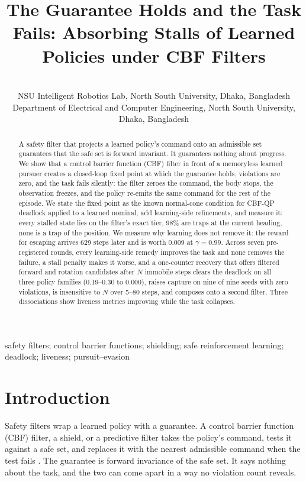 \documentclass{l4dc2027}
\title[Safe and Stuck]{The Guarantee Holds and the Task Fails: Absorbing Stalls of Learned Policies under CBF Filters}
\author{%
 \Name{Mohammad Shoaib} \Email{[to confirm]}\\
 \addr NSU Intelligent Robotics Lab, North South University, Dhaka, Bangladesh
 \AND
 \Name{Shahnewaz Siddique} \Email{shahnewaz.siddique@northsouth.edu}\\
 \addr Department of Electrical and Computer Engineering, North South University, Dhaka, Bangladesh%
}
\begin{document}
\maketitle

\begin{abstract}%
A safety filter that projects a learned policy's command onto an admissible set guarantees that the safe set is forward invariant. It guarantees nothing about progress. We show that a control barrier function (CBF) filter in front of a memoryless learned pursuer creates a closed-loop fixed point at which the guarantee holds, violations are zero, and the task fails silently: the filter zeroes the command, the body stops, the observation freezes, and the policy re-emits the same command for the rest of the episode. We state the fixed point as the known normal-cone condition for CBF-QP deadlock applied to a learned nominal, add learning-side refinements, and measure it: every stalled state lies on the filter's exact tier, 98\% are traps at the current heading, none is a trap of the position. We measure why learning does not remove it: the reward for escaping arrives 629 steps later and is worth 0.009 at $\gamma = 0.99$. Across seven pre-registered rounds, every learning-side remedy improves the task and none removes the failure, a stall penalty makes it worse, and a one-counter recovery that offers filtered forward and rotation candidates after $N$ immobile steps clears the deadlock on all three policy families (0.19--0.30 to 0.000), raises capture on nine of nine seeds with zero violations, is insensitive to $N$ over 5--80 steps, and composes onto a second filter. Three dissociations show liveness metrics improving while the task collapses.%
\end{abstract}

\begin{keywords}%
safety filters; control barrier functions; shielding; safe reinforcement learning; deadlock; liveness; pursuit--evasion%
\end{keywords}

\section{Introduction}\label{sec:intro}

Safety filters wrap a learned policy with a guarantee. A control barrier function (CBF) filter, a shield, or a predictive filter takes the policy's command, tests it against a safe set, and replaces it with the nearest admissible command when the test fails \citep{hsu2024safetyfilter,ames2019cbf,alshiekh2018shielding,cheng2019endtoend}. The guarantee is forward invariance of the safe set. It says nothing about the task, and the two can come apart in a way no violation count reveals.
\end{document}
